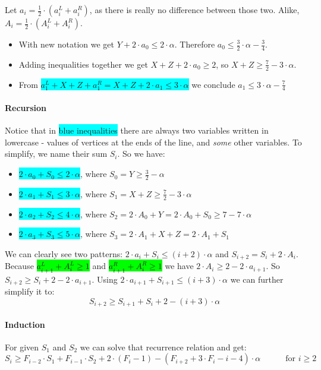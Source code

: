 \documentclass[12pt, A4]{article}
\begin{document}
Let $a_i = \frac{1}{2} \cdot (a_i^L + a_i^R)$, as there is really no difference between those two. Alike, $A_i = \frac{1}{2} \cdot (A_i^L + A_i^R)$.

\begin{itemize}
    \item With new notation we get $Y + 2 \cdot a_0 \le 2 \cdot \alpha$. Therefore $a_0 \le 
    \frac{3}{2} \cdot \alpha - \frac{3}{4}$.
    \item Adding inequalities together we get $X + Z + 2 \cdot a_0 \ge 2$, so $X + Z \ge \frac{7}{2} - 3 \cdot \alpha$.
    \item From \colorbox{cyan}{$a_1^L + X + Z + a_1^R = X + Z + 2 \cdot a_1 \le 3 \cdot \alpha$} we conclude $a_1 \le 3 \cdot \alpha - \frac{7}{4}$
\end{itemize}


\paragraph{Recursion}
Notice that in \colorbox{cyan}{blue inequalities} there are always two variables written in lowercase - values of vertices at the ends of the line, and \textit{some} other variables. To simplify, we name their sum $S_i$. So we have:
\begin{itemize}
    \item \colorbox{cyan}{$2 \cdot a_0 + S_0 \le 2 \cdot \alpha$}, where $S_0 = Y \ge \frac{3}{2} - \alpha$
    \item \colorbox{cyan}{$2 \cdot a_1 + S_1 \le 3 \cdot \alpha$}, where $S_1 = X + Z \ge \frac{7}{2} - 3 \cdot \alpha$
    \item \colorbox{cyan}{$2 \cdot a_2 + S_2 \le 4 \cdot \alpha$}, where $S_2 = 2 \cdot A_0 + Y = 2 \cdot A_0 + S_0 \ge 7 - 7 \cdot \alpha$
    \item \colorbox{cyan}{$2 \cdot a_3 + S_3 \le 5 \cdot \alpha$}, where $S_3 = 2 \cdot A_1 + X + Z = 2 \cdot A_1 + S_1$
\end{itemize}

We can clearly see two patterns: $2 \cdot a_i + S_i \le (i+2) \cdot \alpha$ and $S_{i+2} = S_{i} + 2 \cdot A_{i}$. Because \colorbox{lime}{$a_{i+1}^L + A_i^L \ge 1$} and \colorbox{lime}{$a_{i+1}^R + A_i^R \ge 1$} we have $2 \cdot A_i \ge 2 - 2 \cdot a_{i+1}$. So $S_{i+2} \ge S_i + 2 - 2 \cdot a_{i+1}$. Using $2 \cdot a_{i+1} + S_{i+1} \le (i+3) \cdot \alpha$ we can further simplify it to:
\[
S_{i+2} \ge S_{i+1} + S_i + 2 - (i+3) \cdot \alpha
\]


\paragraph{Induction}
For given $S_1$ and $S_2$ we can solve that recurrence relation and get:
\[
S_i \ge F_{i-2} \cdot S_1 + F_{i-1} \cdot S_2 + 2 \cdot (F_i - 1) - (F_{i+2} + 3 \cdot F_i - i - 4) \cdot \alpha
\quad\quad\quad
\text{for } i \ge 2
\]
\end{document}
